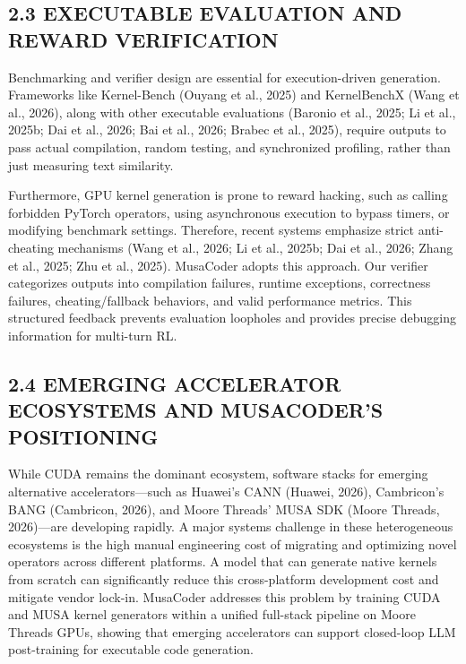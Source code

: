 \documentclass[
  10
]{article}
\begin{document}
\subsection{2.3 EXECUTABLE EVALUATION AND REWARD
VERIFICATION}\label{executable-evaluation-and-reward-verification}

Benchmarking and verifier design are essential for execution-driven
generation. Frameworks like Kernel-Bench (Ouyang et al., 2025) and
KernelBenchX (Wang et al., 2026), along with other executable
evaluations (Baronio et al., 2025; Li et al., 2025b; Dai et al., 2026;
Bai et al., 2026; Brabec et al., 2025), require outputs to pass actual
compilation, random testing, and synchronized profiling, rather than
just measuring text similarity.

Furthermore, GPU kernel generation is prone to reward hacking, such as
calling forbidden PyTorch operators, using asynchronous execution to
bypass timers, or modifying benchmark settings. Therefore, recent
systems emphasize strict anti-cheating mechanisms (Wang et al., 2026; Li
et al., 2025b; Dai et al., 2026; Zhang et al., 2025; Zhu et al., 2025).
MusaCoder adopts this approach. Our verifier categorizes outputs into
compilation failures, runtime exceptions, correctness failures,
cheating/fallback behaviors, and valid performance metrics. This
structured feedback prevents evaluation loopholes and provides precise
debugging information for multi-turn RL.

\subsection{2.4 EMERGING ACCELERATOR ECOSYSTEMS AND MUSACODER'S
POSITIONING}\label{emerging-accelerator-ecosystems-and-musacoders-positioning}

While CUDA remains the dominant ecosystem, software stacks for emerging
alternative accelerators---such as Huawei's CANN (Huawei, 2026),
Cambricon's BANG (Cambricon, 2026), and Moore Threads' MUSA SDK (Moore
Threads, 2026)---are developing rapidly. A major systems challenge in
these heterogeneous ecosystems is the high manual engineering cost of
migrating and optimizing novel operators across different platforms. A
model that can generate native kernels from scratch can significantly
reduce this cross-platform development cost and mitigate vendor lock-in.
MusaCoder addresses this problem by training CUDA and MUSA kernel
generators within a unified full-stack pipeline on Moore Threads GPUs,
showing that emerging accelerators can support closed-loop LLM
post-training for executable code generation.
\end{document}
